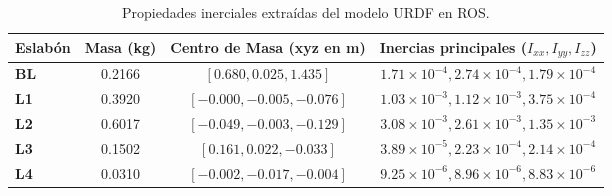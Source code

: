 \begin{table}[h!]
\centering
\begin{tabular}{|l|c|c|c|}
\hline
\textbf{Eslabón} & \textbf{Masa (kg)} & \textbf{Centro de Masa (xyz en m)} & \textbf{Inercias principales ($I_{xx}, I_{yy}, I_{zz}$)} \\ \hline
\textbf{BL} & 0.2166 & $[0.680, 0.025, 1.435]$ & $1.71 \times 10^{-4}, 2.74 \times 10^{-4}, 1.79 \times 10^{-4}$ \\ \hline
\textbf{L1} & 0.3920 & $[-0.000, -0.005, -0.076]$ & $1.03 \times 10^{-3}, 1.12 \times 10^{-3}, 3.75 \times 10^{-4}$ \\ \hline
\textbf{L2} & 0.6017 & $[-0.049, -0.003, -0.129]$ & $3.08 \times 10^{-3}, 2.61 \times 10^{-3}, 1.35 \times 10^{-3}$ \\ \hline
\textbf{L3} & 0.1502 & $[0.161, 0.022, -0.033]$ & $3.89 \times 10^{-5}, 2.23 \times 10^{-4}, 2.14 \times 10^{-4}$ \\ \hline
\textbf{L4} & 0.0310 & $[-0.002, -0.017, -0.004]$ & $9.25 \times 10^{-6}, 8.96 \times 10^{-6}, 8.83 \times 10^{-6}$ \\ \hline
\end{tabular}
\caption{Propiedades inerciales extraídas del modelo URDF en ROS.}
\label{tab:inerciales}
\end{table}
